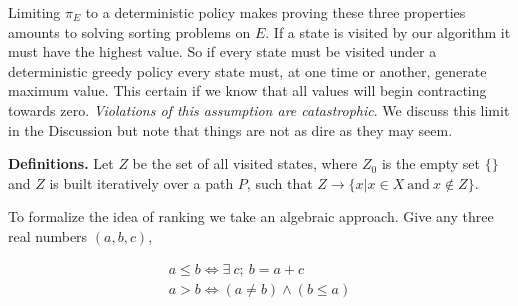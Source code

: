 Limiting $\pi_E$ to a deterministic policy makes proving these three properties amounts to solving sorting problems on $E$. If a state is visited by our algorithm it must have the highest value. So if every state must be visited under a deterministic greedy policy every state must, at one time or another, generate maximum value. This certain if we know that all values will begin contracting towards zero. \textit{Violations of this assumption are catastrophic}. We discuss this limit in the Discussion but note that things are not as dire as they may seem.

\textbf{Definitions.} Let $Z$ be the set of all visited states, where $Z_0$ is the empty set $\{\}$ and $Z$ is built iteratively over a path $P$, such that $Z \rightarrow \{x | x \in X\ \text{and}\ x \not\in Z\}$. 

To formalize the idea of ranking we take an algebraic approach. Give any three real numbers $(a,b,c)$,

\begin{align}\label{eq:ineq} 
	a \leq b \Leftrightarrow \exists \ c;\ b = a + c \\
	a > b \Leftrightarrow (a \neq b) \wedge (b \leq a) 
\end{align}

